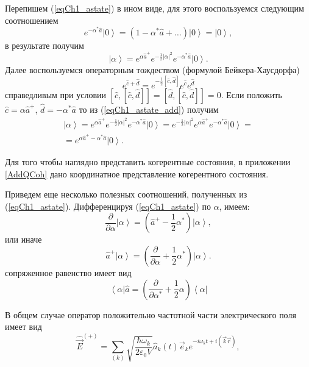Перепишем (\ref{eqCh1_astate}) в ином виде, для этого воспользуемся
следующим соотношением
\[
e^{- \alpha^{*} \hat{a}} \left|0\right> = \left(1 - \alpha^{*} \hat{a} +
\dots\right) \left|0\right> = \left|0\right>,
\]
в результате получим
\begin{equation}
\left|\alpha\right> = 
e^{\alpha \hat{a}^{+}} 
e^{-\frac{1}{2}\left|\alpha\right|^2}
e^{- \alpha^{*} \hat{a}} 
\left|0\right>.
\label{eqCh1_astate_add}
\end{equation}
Далее воспользуемся операторным тождеством (формулой Бейкера-Хаусдорфа)
\begin{equation}
e^{\hat{c} + \hat{d}} = e^{- \frac{1}{2}\left[\hat{c},
    \hat{d}\right]}e^{\hat{c}} e^{\hat{d}} 
\label{eqPart1Ch1_BeikerHausdorf}
\end{equation}
справедливым при условии  
$\left[\hat{c},\left[\hat{c}, \hat{d}\right]\right] =
\left[\hat{d},\left[\hat{c}, \hat{d}\right]\right] = 0$.
Если положить $\hat{c} = \alpha\hat{a}^{+}$, $\hat{d} = -\alpha^*\hat{a}$
то из (\ref{eqCh1_astate_add})  получим 
\begin{eqnarray}
\left|\alpha\right> =  
e^{\alpha \hat{a}^{+}} 
e^{-\frac{1}{2}\left|\alpha\right|^2}
e^{- \alpha^{*} \hat{a}} 
\left|0\right> =
e^{-\frac{1}{2}\left|\alpha\right|^2}
e^{\alpha \hat{a}^{+}} 
e^{- \alpha^{*} \hat{a}} 
\left|0\right> = 
\nonumber \\
=
e^{\alpha \hat{a}^{+} - \alpha^{*} \hat{a}}\left|0\right>.
\label{eqCh1_astate4squeezed}
\end{eqnarray}

Для того чтобы наглядно представить когерентные состояния, в приложении
\ref{AddQCoh} дано координатное представление когерентного состояния. 

Приведем еще несколько полезных соотношений, полученных из
(\ref{eqCh1_astate}). Дифференцируя (\ref{eqCh1_astate}) по  $\alpha$,
имеем:  
\[
\frac{\partial}{\partial \alpha}\left|\alpha\right> = 
\left( \hat{a}^{+} - \frac{1}{2}\alpha^{*}\right)\left|\alpha\right>,
\]
или иначе 
\[
\hat{a}^{+}\left|\alpha\right> = \left(\frac{\partial}{\partial
  \alpha} +  \frac{1}{2}\alpha^{*}\right)\left|\alpha\right>.
\]
сопряженное равенство имеет вид
\[
\left<\alpha\right|\hat{a} = \left(\frac{\partial}{\partial
  \alpha^{*}} +  \frac{1}{2}\alpha\right)\left<\alpha\right|
\]

В общем случае оператор положительно частотной части электрического поля имеет вид
\[
\hat{\vec{E}}^{(+)} = \sum_{(k)} \sqrt{\frac{\hbar \omega_k}{2 \varepsilon_0
V}} \hat{a}_k\left(t\right) \vec{e}_k e^{-i \omega_k t + i \left(\vec{k}\vec{r}
  \right)}, 
\]

